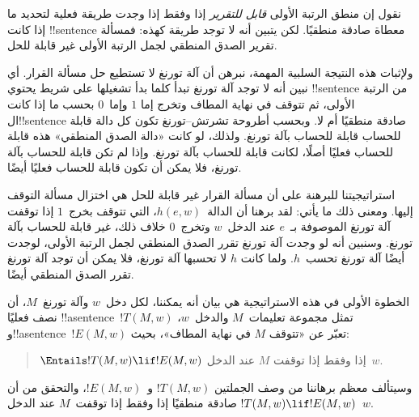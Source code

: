 \documentclass[../../../include/open-logic-section]{subfiles}
\begin{document}

نقول إن منطق الرتبة الأولى \emph{قابل للتقرير} إذا وفقط إذا وجدت
طريقة فعلية لتحديد ما إذا كانت !!{sentence} معطاة صادقة منطقيًا. لكن
يتبين أنه لا توجد طريقة كهذه: فمسألة تقرير الصدق المنطقي لجمل الرتبة
الأولى غير قابلة للحل.

ولإثبات هذه النتيجة السلبية المهمة، نبرهن أن آلة تورنغ لا تستطيع حل
مسألة القرار. أي نبين أنه لا توجد آلة تورنغ تبدأ كلما بدأ تشغيلها على
شريط يحتوي !!{sentence} من الرتبة الأولى، ثم تتوقف في نهاية المطاف
وتخرج إما $1$ وإما~$0$ بحسب ما إذا كانت ال!!{sentence} صادقة منطقيًا
أم لا. وبحسب أطروحة تشرتش--تورنغ تكون كل دالة قابلة للحساب قابلة
للحساب بآلة تورنغ. ولذلك، لو كانت «دالة الصدق المنطقي» هذه قابلة
للحساب فعليًا أصلًا، لكانت قابلة للحساب بآلة تورنغ. وإذا لم تكن قابلة
للحساب بآلة تورنغ، فلا يمكن أن تكون قابلة للحساب فعليًا أيضًا.

استراتيجيتنا للبرهنة على أن مسألة القرار غير قابلة للحل هي اختزال
مسألة التوقف إليها. ومعنى ذلك ما يأتي: لقد برهنا أن الدالة~$h(e,w)$،
التي تتوقف بخرج~$1$ إذا توقفت آلة تورنغ الموصوفة بـ~$e$ عند الدخل~$w$
وتخرج~$0$ خلاف ذلك، غير قابلة للحساب بآلة تورنغ. وسنبين أنه لو وجدت
آلة تورنغ تقرر الصدق المنطقي لجمل الرتبة الأولى، لوجدت أيضًا آلة تورنغ
تحسب~$h$. ولما كانت $h$ لا تحسبها آلة تورنغ، فلا يمكن أن توجد آلة
تورنغ تقرر الصدق المنطقي أيضًا.

الخطوة الأولى في هذه الاستراتيجية هي بيان أنه يمكننا، لكل دخل~$w$
وآلة تورنغ~$M$، أن نصف فعليًا !!a{sentence}~$!T(M,w)$ تمثل مجموعة
تعليمات~$M$ والدخل~$w$، و!!a{sentence}~$!E(M,w)$ تعبّر عن «تتوقف $M$
في نهاية المطاف»، بحيث:
\begin{quote}
  $\Entails !T(M,w) \lif !E(M,w)$ إذا وفقط إذا توقفت $M$ عند الدخل~$w$.
\end{quote}
وسيتألف معظم برهاننا من وصف الجملتين $!T(M,w)$ و~$!E(M,w)$، والتحقق
من أن $!T(M,w)\lif !E(M,w)$ صادقة منطقيًا إذا وفقط إذا توقفت~$M$ عند
الدخل~$w$.
\end{document}
